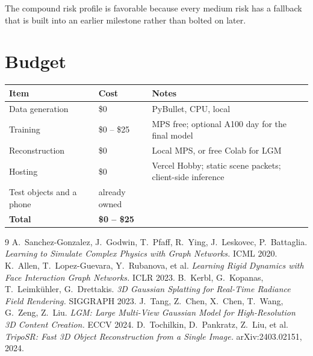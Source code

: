 \documentclass[11pt]{article}
\begin{document}
The compound risk profile is favorable because every medium risk has a fallback that is built into an earlier milestone rather than bolted on later.

\section{Budget}

\begin{center}
\begin{tabular}{@{}lll@{}}
\toprule
\textbf{Item} & \textbf{Cost} & \textbf{Notes} \\
\midrule
Data generation & \$0 & PyBullet, CPU, local \\
Training & \$0 -- \$25 & MPS free; optional A100 day for the final model \\
Reconstruction & \$0 & Local MPS, or free Colab for LGM \\
Hosting & \$0 & Vercel Hobby; static scene packets; client-side inference \\
Test objects and a phone & already owned & \\
\midrule
\textbf{Total} & \textbf{\$0 -- \$25} & \\
\bottomrule
\end{tabular}
\end{center}

\begin{thebibliography}{9}
 A.\ Sanchez-Gonzalez, J.\ Godwin, T.\ Pfaff, R.\ Ying, J.\ Leskovec, P.\ Battaglia. \emph{Learning to Simulate Complex Physics with Graph Networks.} ICML 2020.
 K.\ Allen, T.\ Lopez-Guevara, Y.\ Rubanova, et al. \emph{Learning Rigid Dynamics with Face Interaction Graph Networks.} ICLR 2023.
 B.\ Kerbl, G.\ Kopanas, T.\ Leimk\"uhler, G.\ Drettakis. \emph{3D Gaussian Splatting for Real-Time Radiance Field Rendering.} SIGGRAPH 2023.
 J.\ Tang, Z.\ Chen, X.\ Chen, T.\ Wang, G.\ Zeng, Z.\ Liu. \emph{LGM: Large Multi-View Gaussian Model for High-Resolution 3D Content Creation.} ECCV 2024.
 D.\ Tochilkin, D.\ Pankratz, Z.\ Liu, et al. \emph{TripoSR: Fast 3D Object Reconstruction from a Single Image.} arXiv:2403.02151, 2024.
\end{thebibliography}
\end{document}

